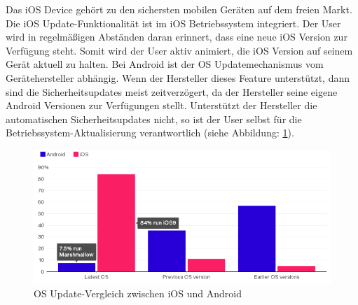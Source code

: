 Das iOS Device gehört zu den sichersten mobilen Geräten auf dem freien Markt. Die iOS Update-Funktionalität ist im iOS Betriebssystem integriert. Der User wird in regelmäßigen Abständen daran erinnert, dass eine neue iOS Version zur Verfügung steht. Somit wird der User aktiv animiert, die iOS Version auf seinem Gerät aktuell zu halten. Bei Android ist der OS Updatemechanismus vom Gerätehersteller abhängig. Wenn der Hersteller dieses Feature unterstützt, dann sind die Sicherheitsupdates meist zeitverzögert, da der Hersteller seine eigene Android Versionen zur Verfügungen stellt. Unterstützt der Hersteller die automatischen Sicherheitsupdates nicht, so ist der User selbst für die Betriebssystem-Aktualisierung verantwortlich (siehe Abbildung: \ref{fig:VergleichUpdateiOSAndroid}).\par
 \begin{figure}[hp!]
        \centering
                \includegraphics[scale=0.8]{Bilder/updatesiOSAndroid.PNG}
        \caption{OS Update-Vergleich zwischen iOS und Android \cite{ANDROID[1]} \protect\footnotemark}
        \label{fig:VergleichUpdateiOSAndroid}
\end{figure}



